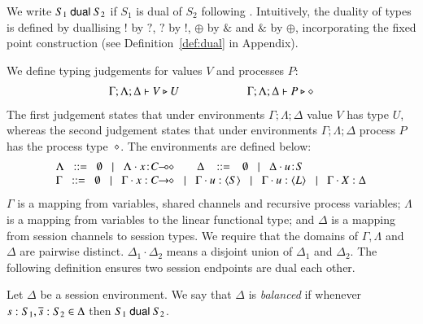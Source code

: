 We write $S_1 \ \mathsf{dual}\  S_2$ if 
$S_1$ is dual of $S_2$ following \cite{TGC14}.  
Intuitively, 
the duality of types is defined by 
duallising $!$ by $?$, $?$ by $!$, $\oplus$ by $\&$ and $\&$ by $\oplus$,  
incorporating the fixed point construction 
(see Definition~\ref{def:dual} in Appendix). 

\smallskip 

\noi We define typing judgements for values $V$
and processes $P$:
%
\[	\begin{array}{c}
		\Gamma; \Lambda; \Delta \vdash V \triangleright U \qquad \qquad \qquad \Gamma; \Lambda; \Delta \vdash P \triangleright \diamond
	\end{array}
\]
The first judgement
states that under environments $\Gamma; \Lambda; \Delta$ value $V$
has type $U$, whereas the second judgement states that under
environments $\Gamma; \Lambda; \Delta$ process $P$ has the process type~$\diamond$. The environments are defined below:
\[
\begin{array}{l}
 \Lambda \bnfis  \emptyset \bnfbar \Lambda \cat \AT{x}{\lhot{C}}
\quad\quad \Delta  \ \bnfis  \ \emptyset \bnfbar \Delta \cat \AT{u}{S} \\
 \Gamma  \bnfis  \emptyset \bnfbar \Gamma \cat \varp{x}: \shot{C} \bnfbar \Gamma \cat u: \chtype{S} \bnfbar \Gamma \cat u: \chtype{L} 
        \bnfbar \Gamma \cat \rvar{X}: \Delta
\end{array}
\]
\noi 
$\Gamma$ is a mapping from variables, shared channels and recursive 
process variables;  $\Lambda$ is a mapping from variables to 
the linear functional type; and $\Delta$ is a mapping from 
session channels to session types. 
We require that the domains of $\Gamma,
\Lambda$ and $\Delta$ are pairwise distinct. $\Delta_1\cdot \Delta_2$ means 
a disjoint union of $\Delta_1$ and $\Delta_2$.  
The following definition ensures two session endpoints 
are dual each other. 

\smallskip

\begin{definition}[Balanced]\label{d:wtenv}%
	Let $\Delta$ be a session environment.
	We say that $\Delta$ is {\em balanced} if whenever
	$s: S_1, \overline{s}: S_2 \in \Delta$ then $S_1 \ \mathsf{dual}\  S_2$.
\end{definition}

